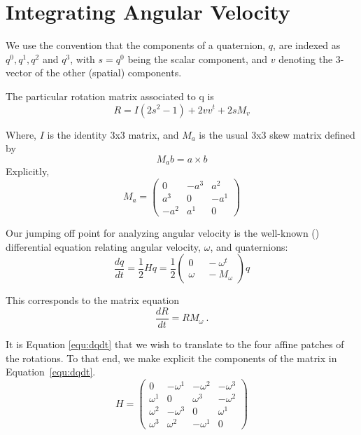 \documentclass{gen-j-l}
\theoremstyle{definition}
\theoremstyle{remark}
\numberwithin{equation}{section}
\begin{document}
\section{Integrating Angular Velocity}

We use the convention that the components of a quaternion, $q$, are
indexed as $q^0, q^1, q^2$ and $q^3$, with $s = q^0$ being the scalar
component, and $v$ denoting the 3-vector of the other (spatial) components.  

The particular rotation matrix associated to q is
\begin{equation*}
R = I (2 s^2 - 1) + 2vv^t + 2sM_v
\end{equation*}

Where, $I$ is the identity 3x3 matrix, and  
$M_a$ is the usual 3x3 skew matrix defined by 
\[ M_a b = a \times b \]
Explicitly,
\begin{equation*}
M_a = \left(
\begin{array}{ccc}
0       & -a^3   & a^2 \\
a^3   &   0      & -a^1 \\
-a^2  &   a^1  &   0
\end{array}
\right)
\end{equation*}

Our jumping off point for analyzing angular velocity is the well-known
(\cite{schultz06}\cite{rogers03})
differential equation relating angular velocity, $\omega$, and quaternions:
\begin{equation}
\label{equ:dqdt}
\frac{dq}{dt} = \frac{1}{2} H q = \frac{1}{2} 
\left(
\begin{array}{cc}
0 &\ \  -\omega^t \\
\omega & \ \ -M_\omega
\end{array}
\right)
q
\end{equation}

This corresponds to the matrix equation
\begin{equation*}
\frac{dR}{dt} = R M_\omega \ .
\end{equation*}
 
It is Equation \ref{equ:dqdt} that we wish to translate to the four affine 
patches of the rotations.  To that end, we make explicit the components 
of the matrix in Equation~\ref{equ:dqdt}.
\begin{equation}
H = \left(
\begin{array}{cccc}
0                 &     -\omega^1   &   -\omega^2  &    -\omega^3   \\
\omega^1  &          0             & \omega^3    & -\omega^2         \\
\omega^2  &  -\omega^3    &        0            & \omega^1          \\
\omega^3  &   \omega^2   &   -\omega^1  &        0
\end{array}
\right)
\end{equation}
\end{document}
